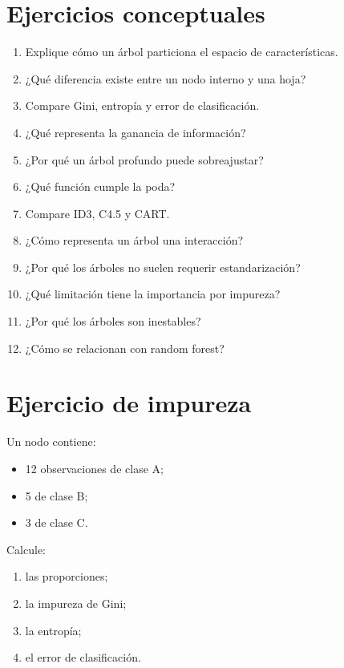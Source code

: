 \documentclass[
  spanish,
  10.5pt,
  letterpaper,
  DIV=11,
  numbers=noendperiod,
  oneside,
  open=any]{scrreprt}
\providecommand{\tightlist}{%
  \setlength{\itemsep}{0pt}\setlength{\parskip}{0pt}}
\theoremstyle{definition}
\theoremstyle{definition}
\theoremstyle{plain}
\theoremstyle{remark}
\begin{document}
\section*{Ejercicios conceptuales}\label{ejercicios-conceptuales-11}


\begin{enumerate}
\def\labelenumi{\arabic{enumi}.}
\tightlist
\item
  Explique cómo un árbol particiona el espacio de características.
\item
  ¿Qué diferencia existe entre un nodo interno y una hoja?
\item
  Compare Gini, entropía y error de clasificación.
\item
  ¿Qué representa la ganancia de información?
\item
  ¿Por qué un árbol profundo puede sobreajustar?
\item
  ¿Qué función cumple la poda?
\item
  Compare ID3, C4.5 y CART.
\item
  ¿Cómo representa un árbol una interacción?
\item
  ¿Por qué los árboles no suelen requerir estandarización?
\item
  ¿Qué limitación tiene la importancia por impureza?
\item
  ¿Por qué los árboles son inestables?
\item
  ¿Cómo se relacionan con random forest?
\end{enumerate}

\section*{Ejercicio de impureza}\label{ejercicio-de-impureza}


Un nodo contiene:

\begin{itemize}
\tightlist
\item
  12 observaciones de clase A;
\item
  5 de clase B;
\item
  3 de clase C.
\end{itemize}

Calcule:

\begin{enumerate}
\def\labelenumi{\arabic{enumi}.}
\tightlist
\item
  las proporciones;
\item
  la impureza de Gini;
\item
  la entropía;
\item
  el error de clasificación.
\end{enumerate}
\end{document}
